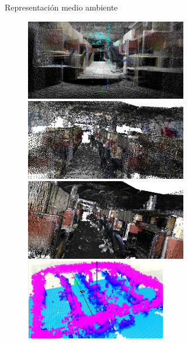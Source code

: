 \documentclass[
  24pt, %
  aspectratio=169, %
]{beamer}
\begin{document}
\begin{frame}{Representación medio ambiente}
  \begin{figure}[ht!]
    \centering
    \begin{minipage}{0.48\textwidth}
      \centering
      \includegraphics[width=\linewidth,height=3.5cm]{ROS_MAP2} %
    \end{minipage}\hfill
    \begin{minipage}{0.48\textwidth}
      \centering
      \includegraphics[width=\linewidth,height=3.5cm]{ROS_MAP3} %
    \end{minipage}
    \vspace{-0.2cm} %
    \begin{minipage}{0.48\textwidth}
      \centering
      \includegraphics[width=\linewidth,height=3.5cm]{ROS_MAP4} %
    \end{minipage}\hfill
    \begin{minipage}{0.48\textwidth}
      \centering
      \includegraphics[width=\linewidth,height=3.5cm]{ROS_MAP6} %
    \end{minipage}
  \end{figure}
\end{frame}
\end{document}
